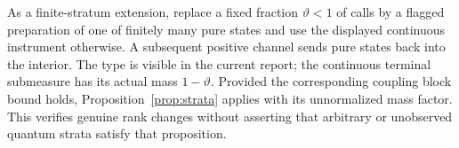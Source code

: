 As a finite-stratum extension, replace a fixed fraction $\vartheta<1$ of calls by a flagged preparation of one of finitely many pure states and use the displayed continuous instrument otherwise. A subsequent positive channel sends pure states back into the interior. The type is visible in the current report; the continuous terminal submeasure has its actual mass $1-\vartheta$. Provided the corresponding coupling block bound holds, Proposition~\ref{prop:strata} applies with its unnormalized mass factor. This verifies genuine rank changes without asserting that arbitrary or unobserved quantum strata satisfy that proposition.
